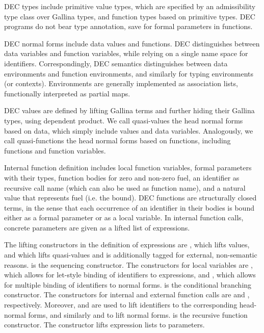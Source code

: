 \documentclass{article}
\begin{document}
DEC types include primitive value types, which are specified by an
admissibility type class over Gallina types, and function types based
on primitive types. DEC programs do not bear type annotation, save for
formal parameters in functions.

DEC normal forms include data values and functions. DEC distinguishes
between data variables and function variables, while relying on a
single name space for identifiers. Correspondingly, DEC semantics
distinguishes between data environments and function environments, and
similarly for typing environments (or contexts). Environments are
generally implemented as association lists, functionally interpreted
as partial maps.

DEC values are defined by lifting Gallina terms and further hiding
their Gallina types, using dependent product. We call quasi-values the
head normal forms based on data, which simply include values and data
variables. Analogously, we call quasi-functions the head normal forms
based on functions, including functions and function variables.

Internal function definition includes local function variables, formal
parameters with their types, function bodies for zero and non-zero
fuel, an identifier as recursive call name (which can also be used as
function name), and a natural value that represents fuel (i.e. the
bound). DEC functions are structurally closed terms, in the sense that
each occurrence of an identifier in their bodies is bound either as a
formal parameter or as a local variable. In internal function calls,
concrete parameters are given as a lifted list of expressions.

The lifting constructors in the definition of expressions are
, which lifts values, and  which lifts
quasi-values and is additionally tagged for external, non-semantic
reasons.  is the sequencing constructor. The constructors
for local variables are , which allows for let-style
binding of identifiers to expressions, and , which allows
for multiple binding of identifiers to normal forms. 
is the conditional branching constructor. The constructors for
internal and external function calls are  and ,
respectively. Moreover,  and  are used to lift
identifiers to the corresponding head-normal forms, and similarly
 and  to lift normal forms.  is the recursive
function constructor. The constructor  lifts expression lists
to parameters.
\end{document}
